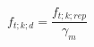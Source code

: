 \documentclass[12pt]{article}
\begin{document}
\begin{displaymath}
f_{t;k;d} = \frac {f_{t;k;rep}} {\gamma_m}
\end{displaymath}
\end{document}
